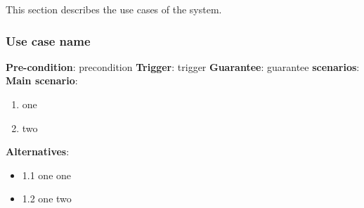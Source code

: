 This section describes the use cases of the system.

\subsubsection{Use case name}
\textbf{Pre-condition}: precondition
\textbf{Trigger}: trigger
\textbf{Guarantee}: guarantee
\textbf{scenarios}:
\hangindent=0.5cm 	\textbf{Main scenario}:
					\begin{enumerate}
						\item one
						\item two
					\end{enumerate}
\hangindent=0.5cm 	\textbf{Alternatives}:
					\begin{itemize}
						\item 1.1 one one
						\item 1.2 one two
					\end{itemize}
